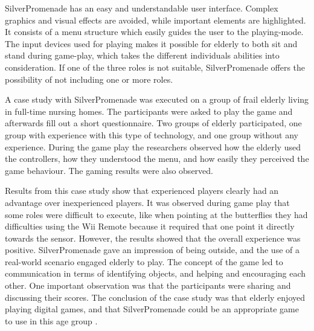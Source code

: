 SilverPromenade has an easy and understandable user interface. Complex graphics and visual effects are avoided, while important elements are highlighted. It consists of a menu structure which easily guides the user to the playing-mode. The input devices used for playing makes it possible for elderly to both sit and stand during game-play, which takes the different individuals abilities into consideration.  If one of the three roles is not suitable, SilverPromenade offers the possibility of not including one or more roles.

A case study with SilverPromenade was executed on a group of frail elderly living in full-time nursing homes. The participants were asked to play the game and afterwards fill out a short questionnaire. Two groups of elderly participated, one group with experience with this type of technology, and one group without any experience. During the game play the researchers observed how the elderly used the controllers, how they understood the menu, and how easily they perceived the game behaviour. The gaming results were also observed.

Results from this case study show that experienced players clearly had an advantage over inexperienced players. It was observed during game play that some roles were difficult to execute, like when pointing at the butterflies they had difficulties using the Wii Remote because it required that one point it directly towards the sensor. However, the results showed that the overall experience was positive. SilverPromenade gave an impression of being outside, and the use of a real-world scenario engaged elderly to play. The concept of the game led to communication in terms of identifying objects, and helping and encouraging each other. One important observation was that the participants were sharing and discussing their scores. The conclusion of the case study was that elderly enjoyed playing digital games, and that SilverPromenade could be an appropriate game to use in this age group \cite{gerling2}.

